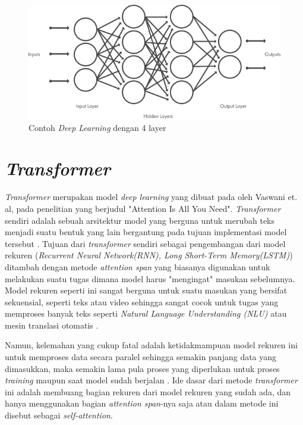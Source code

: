 \begin{figure}[h]
    \centering
    \includegraphics[width=\textwidth]{gambar/deeplearning_layer.png}
    \caption{Contoh \textit{Deep Learning} dengan 4 layer \cite{mathwork_deeplearning}}
    \label{fig: deeplearning_layer}
\end{figure}

\section{\textit{Transformer}}

\textit{Transformer} merupakan model \textit{deep learning} yang dibuat pada oleh Vaswani et. al, pada penelitian yang berjudul "Attention Is All You Need". \textit{Transformer} sendiri adalah sebuah arsitektur model yang berguna untuk merubah teks menjadi suatu bentuk yang lain bergantung pada tujuan implementasi model tersebut \cite{attention_is_all_you_need}. Tujuan dari \textit{transformer} sendiri sebagai pengembangan dari model rekuren (\textit {Recurrent Neural Network(RNN), Long Short-Term Memory(LSTM)}) ditambah dengan metode \textit{attention span} yang biasanya digunakan untuk melakukan suatu tugas dimana model harus "mengingat" masukan sebelumnya. Model rekuren seperti ini sangat berguna untuk suatu masukan yang bersifat sekuensial, seperti teks atau video sehingga sangat cocok untuk tugas yang memproses banyak teks seperti \textit{Natural Language Understanding (NLU)} atau mesin translasi otomatis \cite{lion_transformer}.

Namun, kelemahan yang cukup fatal adalah ketidakmampuan model rekuren ini untuk memproses data secara paralel sehingga semakin panjang data yang dimasukkan, maka semakin lama pula proses yang diperlukan untuk proses \textit{training} maupun saat model sudah berjalan \cite{attention_is_all_you_need}. Ide dasar dari metode \textit{transformer} ini adalah membuang bagian rekuren dari model rekuren yang sudah ada, dan hanya menggunakan bagian \textit{attention span}-nya saja atau dalam metode ini disebut sebagai \textit{self-attention}.

